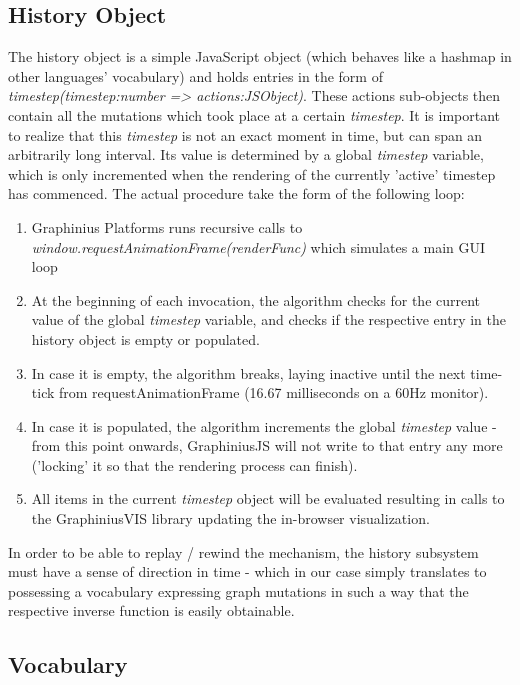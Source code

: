 	\subsection{History Object}
	\label{ssect:history_object}

	The history object is a simple JavaScript object (which behaves like a hashmap in other languages' vocabulary) and holds entries in the form of \textit{timestep(timestep:number => actions:JSObject)}. These actions sub-objects then contain all the mutations which took place at a certain \textit{timestep}. It is important to realize that this \textit{timestep} is not an exact moment in time, but can span an arbitrarily long interval. Its value is determined by a global \textit{timestep} variable, which is only incremented when the rendering of the currently 'active' timestep has commenced. The actual procedure take the form of the following loop:
	
	\begin{enumerate}
		\item Graphinius Platforms runs recursive calls to \textit{window.requestAnimationFrame(renderFunc)} which simulates a main GUI loop
		\item At the beginning of each invocation, the algorithm checks for the current value of the global \textit{timestep} variable, and checks if the respective entry in the history object is empty or populated.
		\item In case it is empty, the algorithm breaks, laying inactive until the next time-tick from requestAnimationFrame (16.67 milliseconds on a 60Hz monitor).
		\item In case it is populated, the algorithm increments the global \textit{timestep} value - from this point onwards, GraphiniusJS will not write to that entry any more ('locking' it so that the rendering process can finish).
		\item All items in the current \textit{timestep} object will be evaluated resulting in calls to the GraphiniusVIS library updating the in-browser visualization.
	\end{enumerate}
	
	In order to be able to replay / rewind the mechanism, the history subsystem must have a sense of direction in time - which in our case simply translates to possessing a vocabulary expressing graph mutations in such a way that the respective inverse function is easily obtainable.
	
	\subsection{Vocabulary}
	\label{ssect:vocabulary}
	
